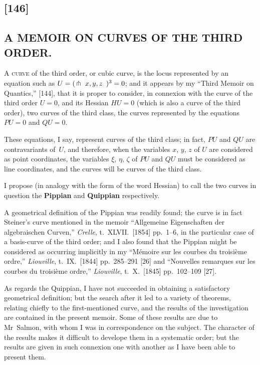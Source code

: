 \documentclass[11pt,a4paper]{book}
\begin{document}
\begin{center}
\section*{[146]}
\subsection*{A MEMOIR ON CURVES OF THE THIRD ORDER.}


\medskip
A \textsc{curve} of the third order, or cubic curve, is the locus
represented by an equation such as $U = (\,\pitchfork\!\,\mathord{\mkern1mu\vrule\mkern1mu}\, x, y, z \,\mathord{\mkern1mu\vrule\mkern1mu}\,)^{3} = 0$;
and it appears by my ``Third Memoir on Quantics,'' [144],
that it is proper to consider, in connexion with the curve of
the third order $U = 0$, and its Hessian $HU = 0$ (which is also
a curve of the third order), two curves of the third class, \viz{}
the curves represented by the equations $PU = 0$ and $QU = 0$.

These equations, I say, represent curves of the third class;
in fact, $PU$ and $QU$ are contravariants of~$U$, and therefore,
when the variables $x$, $y$, $z$ of $U$ are considered as point
coordinates, the variables $\xi$, $\eta$, $\zeta$ of $PU$ and $QU$ must
be considered as line coordinates, and the curves will be curves
of the third class.

I propose (in analogy with the form of the word Hessian) to
call the two curves in question the \textbf{Pippian} and \textbf{Quippian}
respectively.

\medskip
[The curve $PU = 0$ is now usually called the \textbf{Cayleyan}.]

\medskip
A geometrical definition of the Pippian was readily found;
the curve is in fact Steiner's curve mentioned in the memoir
``Allgemeine Eigenschaften der algebraischen Curven,''
\textit{Crelle}, t.~XLVII.\ [1854] pp.~1--6, in the particular case of a
basis-curve of the third order; and I also found that the
Pippian might be considered as occurring implicitly in my
``M\'{e}moire sur les courbes du troisi\`{e}me ordre,'' \textit{Liouville},
t.~IX.\ [1844] pp.~285--291 [26] and ``Nouvelles remarques
sur les courbes du troisi\`{e}me ordre,'' \textit{Liouville}, t.~X.\ [1845]
pp.~102--109 [27].

As regards the Quippian, I have not succeeded in obtaining
a satisfactory geometrical definition; but the search after it
led to a variety of theorems, relating chiefly to the first-mentioned
curve, and the results of the investigation are contained in the
present memoir. Some of these results are due to Mr~Salmon,
with whom I was in correspondence on the subject. The character
of the results makes it difficult to develope them in a systematic
order; but the results are given in such connexion one with
another as I have been able to present them.


\end{center}
\end{document}
